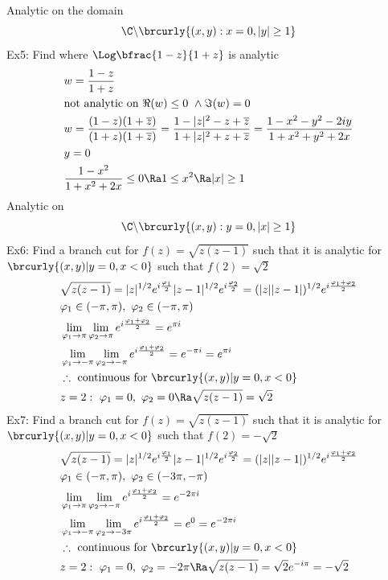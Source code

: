 Analytic on the domain
\[ \C\backslash\brcurly{(x,y):x=0,|y|\geq1} \]
Ex5: Find where $\Log\bfrac{1-z}{1+z}$ is analytic
\begin{align*}
    &w=\frac{1-z}{1+z}\\
    &\text{not analytic on }\Re(w)\leq 0\ \wedge\Im(w)=0\\
    &w=\frac{(1-z)(1+\overline{z})}{(1+z)(1+\overline{z})}=\frac{1-|z|^2-z+\overline{z}}{1+|z|^2+z+\overline{z}}=\frac{1-x^2-y^2-2iy}{1+x^2+y^2+2x}\\
    &y=0\\
    &\frac{1-x^2}{1+x^2+2x}\leq0\Ra 1\leq x^2\Ra |x|\geq 1
\end{align*}
Analytic on
\[ \C\backslash\brcurly{(x,y):y=0,|x|\geq1} \]
Ex6: Find a branch cut for $f(z)=\sqrt{z(z-1)}$ such that it is analytic for $\brcurly{(x,y)|y=0,x<0}$ such that $f(2)=\sqrt{2}$
\begin{align*}
    &\sqrt{z(z-1)}=|z|^{1/2}e^{i\frac{\varphi_1}{2}}|z-1|^{1/2}e^{i\frac{\varphi_2}{2}}=(|z||z-1|)^{1/2}e^{i\frac{\varphi_1+\varphi_2}{2}}\\
    &\varphi_1\in(-\pi,\pi),\ \varphi_2\in(-\pi,\pi)\\
    &\lim_{\varphi_1\to\pi}\lim_{\varphi_2\to\pi}e^{i\frac{\varphi_1+\varphi_2}{2}}=e^{\pi i}\\
    &\lim_{\varphi_1\to-\pi}\lim_{\varphi_2\to-\pi}e^{i\frac{\varphi_1+\varphi_2}{2}}=e^{-\pi i}=e^{\pi i}\\
    &\therefore \text{ continuous for }\brcurly{(x,y)|y=0,x<0}\\
    &z=2:\ \varphi_1=0,\ \varphi_2=0\Ra \sqrt{z(z-1)}=\sqrt{2}
\end{align*}
Ex7: Find a branch cut for $f(z)=\sqrt{z(z-1)}$ such that it is analytic for $\brcurly{(x,y)|y=0,x<0}$ such that $f(2)=-\sqrt{2}$
\begin{align*}
    &\sqrt{z(z-1)}=|z|^{1/2}e^{i\frac{\varphi_1}{2}}|z-1|^{1/2}e^{i\frac{\varphi_2}{2}}=(|z||z-1|)^{1/2}e^{i\frac{\varphi_1+\varphi_2}{2}}\\
    &\varphi_1\in(-\pi,\pi),\ \varphi_2\in(-3\pi,-\pi)\\
    &\lim_{\varphi_1\to\pi}\lim_{\varphi_2\to-\pi}e^{i\frac{\varphi_1+\varphi_2}{2}}=e^{-2\pi i}\\
    &\lim_{\varphi_1\to-\pi}\lim_{\varphi_2\to-3\pi}e^{i\frac{\varphi_1+\varphi_2}{2}}=e^{0}=e^{-2\pi i}\\
    &\therefore \text{ continuous for }\brcurly{(x,y)|y=0,x<0}\\
    &z=2:\ \varphi_1=0,\ \varphi_2=-2\pi\Ra \sqrt{z(z-1)}=\sqrt{2}e^{-i\pi}=-\sqrt{2}
\end{align*}
